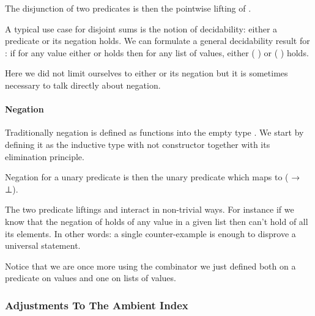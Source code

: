 The disjunction of two predicates is then the pointwise lifting of .


A typical use case for disjoint sums is the notion of decidability: either
a predicate or its negation holds. We can formulate a general decidability
result for : if for any value either  or  holds then for
any list of values, either {( )} or {( )} holds.


Here we did not limit ourselves to either  or its negation but it is
sometimes necessary to talk directly about negation.

\paragraph{Negation} Traditionally negation is defined as functions into
the empty type . We start by defining it as the inductive type with
not constructor together with its elimination principle.

\begin{minipage}[t]{0.225\textwidth}
\end{minipage}\begin{minipage}[t]{0.225\textwidth}
\end{minipage}

Negation for a unary predicate  is then the unary predicate which maps
 to {(  → ⊥)}.


The two predicate liftings  and  interact in non-trivial ways.
For instance if we know that the negation of  holds of any value in a
given list then  can't hold of all its elements. In other words: a
single counter-example is enough to disprove a universal statement.


Notice that we are once more using the combinator we just defined both on
a predicate on values and one on lists of values.

\subsubsection{Adjustments To The Ambient Index}\label{sec:iupdates}

